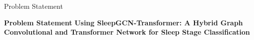 \begin{frame}{Problem Statement}
    \begin{block}{\centering \textbf{Problem Statement}}
        \centering
        \textbf{Using  SleepGCN-Transformer: A Hybrid Graph Convolutional and Transformer Network for Sleep Stage Classification}
    \end{block}
\end{frame}
